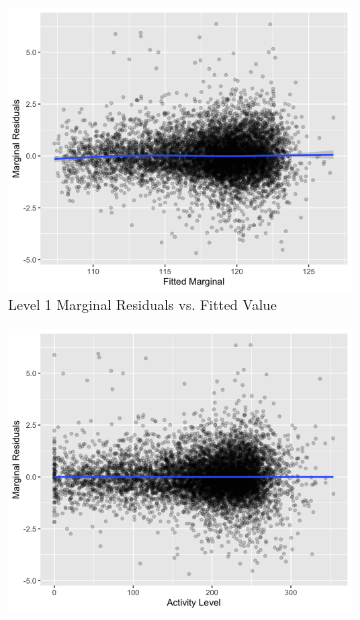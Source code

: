 \documentclass[12pt,twoside,letterpaper]{article}
\theoremstyle{definition}
\theoremstyle{definition}
\begin{document}
\begin{figure} 
\centering
\begin{subfigure}[b]{0.475\textwidth}
\centering
\includegraphics[width=\textwidth]{pics/mar resid fit.png}
\caption[]%
{{\small Level 1 Marginal Residuals vs. Fitted Value}}
\label{fig: mar resid v fit}
\end{subfigure}
\hfill
\begin{subfigure}[b]{0.475\textwidth}
\centering
\includegraphics[width=\textwidth]{pics/mar resid act.png}
\caption[]%
{{\small }}
\label{fig: mar resid v act}

\end{subfigure}
\end{figure}
\end{document}

